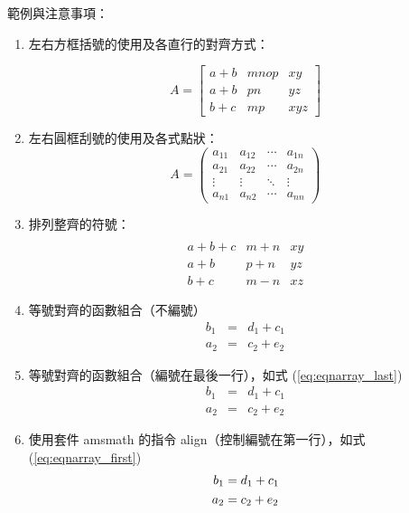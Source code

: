 範例與注意事項：
\begin{enumerate}
  \item 左右方框括號的使用及各直行的對齊方式：
 
        $$ A = \left[
            \begin{array}{clr}
                a+b & mnop  & xy \\
                a+b & pn    & yz \\
                b+c & mp    & xyz
            \end{array} \right] $$

  \item 左右圓框刮號的使用及各式點狀：
        $$ A=\left(
            \begin{array}{cccc}
                a_{11} 	& a_{12} & \cdots 	& a_{1n}\\
                a_{21} 	& a_{22} & \cdots 	& a_{2n}\\
                \vdots 	& \vdots & \ddots	& \vdots\\
                a_{n1} 	& a_{n2} & \cdots 	& a_{nn}
            \end{array} \right) $$

  \item 排列整齊的符號：
        $$ \begin{array}{clr}\\
            a+b+c   & m+n 	& xy \\
            a+b     & p+n 	& yz \\
            b+c     & m-n 	& xz
        \end{array} $$

    \item 等號對齊的函數組合（不編號）
        \begin{eqnarray*}
          b_1 &=& d_1+c_1 \\
          a_2 &=& c_2+e_2
        \end{eqnarray*}

    \item 等號對齊的函數組合（編號在最後一行），如式 (\ref{eq:eqnarray_last})
        \begin{eqnarray}\label{eq:eqnarray_last}
\nonumber b_1 &=& d_1+c_1 \\
          a_2 &=& c_2+e_2
        \end{eqnarray}

    \item 使用套件 {\A amsmath} 的指令 {\A align}（控制編號在第一行），如式 (\ref{eq:eqnarray_first})
        \begin{align} 
            b_1 &= d_1+c_1 \label{eq:eqnarray_first}\\
            a_2 &= c_2+e_2 \notag
        \end{align}


\end{enumerate}
